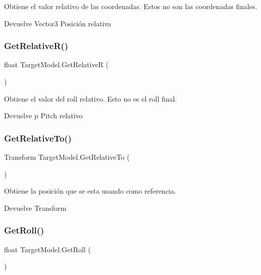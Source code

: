 Obtiene el valor relativo de las coordenadas. Estos no son las coordenadas finales. \begin{DoxyReturn}{Devuelve}
Vector3 Posición relativa 
\end{DoxyReturn}
\mbox{\label{class_target_model_ae564153ce4906bd59461949b2531b5ff}} 
\subsubsection{\texorpdfstring{GetRelativeR()}{GetRelativeR()}}
{\footnotesize\ttfamily float Target\+Model.\+Get\+RelativeR (\begin{DoxyParamCaption}{ }\end{DoxyParamCaption})\hspace{0.3cm}{\ttfamily [inline]}}

Obtiene el valor del roll relativo. Esto no es el roll final. \begin{DoxyReturn}{Devuelve}
p Pitch relativo 
\end{DoxyReturn}
\mbox{\label{class_target_model_a601f2538a41b5bdaba72c3f81d820710}} 
\subsubsection{\texorpdfstring{GetRelativeTo()}{GetRelativeTo()}}
{\footnotesize\ttfamily Transform Target\+Model.\+Get\+Relative\+To (\begin{DoxyParamCaption}{ }\end{DoxyParamCaption})\hspace{0.3cm}{\ttfamily [inline]}}

Obtiene la posición que se esta usando como referencia. \begin{DoxyReturn}{Devuelve}
Transform 
\end{DoxyReturn}
\mbox{\label{class_target_model_a8cd198c6d6a066183432127e2dc68390}} 
\subsubsection{\texorpdfstring{GetRoll()}{GetRoll()}}
{\footnotesize\ttfamily float Target\+Model.\+Get\+Roll (\begin{DoxyParamCaption}{ }\end{DoxyParamCaption})\hspace{0.3cm}{\ttfamily [inline]}}

